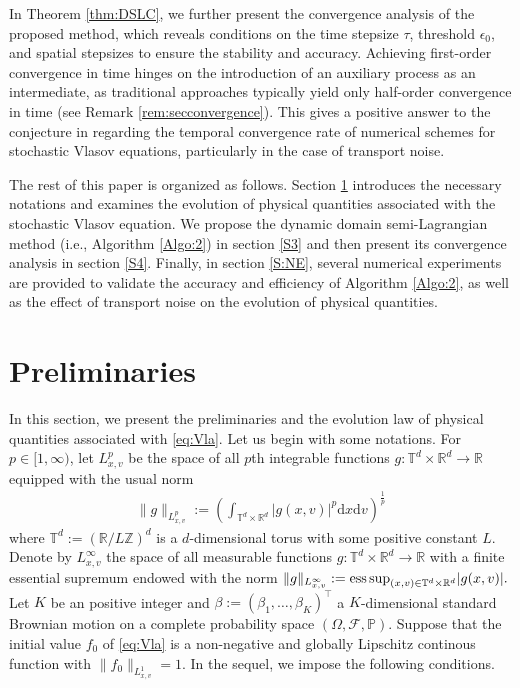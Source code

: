 \documentclass[11pt,reqno]{amsproc}
\newcommand{\ud}{\mathrm d}
\newcommand{\R}{\mathbb{R}}
\numberwithin{equation}{section}
\begin{document}
In Theorem \ref{thm:DSLC}, we further present the convergence analysis of the proposed method, which reveals conditions on the time stepsize $\tau$, threshold $\epsilon_0$, and spatial stepsizes to ensure the stability and accuracy. Achieving first-order convergence in time hinges on the introduction of an auxiliary process as an intermediate, as traditional approaches typically yield only half-order convergence in time (see Remark \ref{rem:secconvergence}). 
This gives a positive answer to the conjecture in \cite{BC24} regarding  the temporal convergence rate of numerical schemes for stochastic Vlasov equations, particularly in the case of transport noise.



The rest of this paper is organized as follows. Section \ref{S2} introduces the necessary notations and examines the evolution of physical quantities associated with the stochastic Vlasov equation. We propose the dynamic domain semi-Lagrangian method (i.e., Algorithm \ref{Algo:2}) in section \ref{S3} and then present its convergence analysis in section \ref{S4}. 
Finally, in section \ref{S:NE}, several numerical experiments are provided to validate the accuracy and efficiency of Algorithm \ref{Algo:2}, as well as the effect of transport noise on the evolution of physical quantities. 


\section{Preliminaries}\label{S2}
In this section, we present the preliminaries and the evolution law of physical quantities associated with \eqref{eq:Vla}. Let us begin with some notations.
For $p\in[1,\infty)$, let $L_{x,v}^{p}$ be the space of all $p$th integrable functions $g:\mathbb{T}^d\times\R^d\to\R$ equipped with the usual norm 
\begin{align*}
\|g\|_{L_{x,v}^{p}}:=\left(\int_{\mathbb{T}^d\times\R^d}|g(x,v)|^p\ud x\ud v\right)^{\frac1p}
\end{align*}
where $\mathbb{T}^d:=(\R/L\mathbb{Z})^d$ is a $d$-dimensional torus with some positive constant $L$.
Denote by $L_{x,v}^{\infty}$ the space of all measurable functions $g:\mathbb{T}^d\times\R^d\to \R$ with a finite essential supremum endowed with the norm $\|g\|_{L_{x, v}^{\infty}}:=\textup{ess\,sup}_{(x, v) \in \mathbb{T}^d \times \mathbb{R}^d}
|g(x, v)|.$ Let $K$ be an positive integer and $\beta:=(\beta_1,\ldots,\beta_K)^\top$ a $K$-dimensional standard Brownian motion on a complete probability space $(\Omega,\mathscr{F},\mathbb{P})$.
 Suppose that the initial value $f_0$ of \eqref{eq:Vla} is a non-negative and globally Lipschitz continous function with  
$\|f_0\|_{L_{x,v}^1}=1$. In the sequel, we impose the following conditions.
\end{document}

